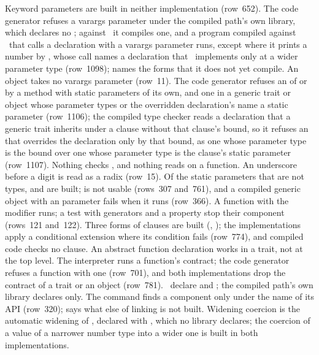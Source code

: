 \begin{description}
Keyword parameters are built in neither implementation (row~652).
The code generator refuses a varargs parameter under the compiled path's own
library, which declares no ; against \library\ it compiles
one, and a program compiled against \library\ that calls a declaration with a
varargs parameter runs, except where it prints a number by , whose
call names a declaration that \library\ implements only at a wider parameter
type (row~1098);
 names the forms that it does not yet compile.
An object takes no varargs parameter (row~11).
The code generator refuses an  of or by a method with static
parameters of its own, and one in a generic trait or object whose parameter
types or the overridden declaration's name a static parameter (row~1106);
the compiled type checker reads a declaration that a generic trait inherits
under a  clause without that clause's bound, so it refuses an
 that overrides the declaration only by that bound, as one
whose parameter type is the bound over one whose parameter type is the
clause's static parameter (row~1107).
Nothing checks , and nothing reads  on a function.
An underscore before a digit is read as a radix (row~15).
Of the static parameters that are not types,  and  are
built;  is not usable (rows~307 and~761), and a compiled generic
object with an  parameter fails when it runs (row~366).
A function with the modifier  runs; a test with generators and a
property stop their component (rows~121 and~122).
Three forms of  clauses are built (,
); the implementations apply a conditional
extension where its condition fails (row~774), and compiled code checks no
 clause.
An abstract function declaration works in a trait, not at the top level.
The interpreter runs a function's contract; the code generator refuses a
function with one (row~701), and both implementations drop the contract of a
trait or an object (row~781).
\library\ declare  and ; the compiled path's
own library declares  only.
The command  finds a component only under the name of its
API (row~320);  says what else of linking is not
built.
Widening coercion is the automatic widening of , declared
with , which no library declares; the coercion of a value of a
narrower number type into a wider one is built in both implementations.

\end{description}
